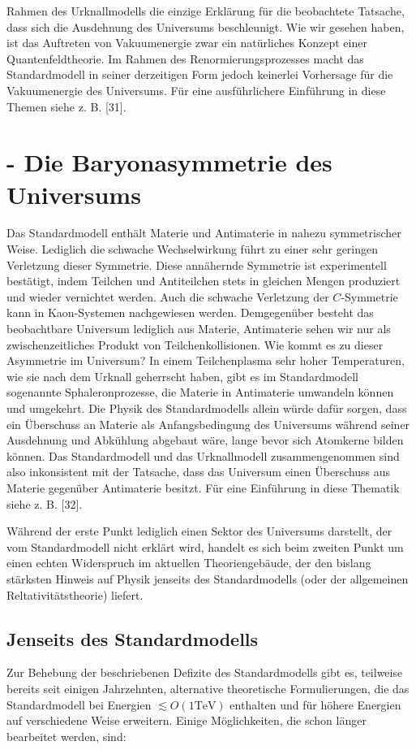\documentclass[10pt, letterpaper]{article}
\begin{document}
Rahmen des Urknallmodells die einzige Erklärung für die beobachtete Tatsache, dass sich die Ausdehnung des Universums beschleunigt. Wie wir gesehen haben, ist das Auftreten von Vakuumenergie zwar ein natürliches Konzept einer Quantenfeldtheorie. Im Rahmen des Renormierungsprozesses macht das Standardmodell in seiner derzeitigen Form jedoch keinerlei Vorhersage für die Vakuumenergie des Universums. Für eine ausführlichere Einführung in diese Themen siehe z. B. [31].

\section*{- Die Baryonasymmetrie des Universums}
Das Standardmodell enthält Materie und Antimaterie in nahezu symmetrischer Weise. Lediglich die schwache Wechselwirkung führt zu einer sehr geringen Verletzung dieser Symmetrie. Diese annähernde Symmetrie ist experimentell bestätigt, indem Teilchen und Antiteilchen stets in gleichen Mengen produziert und wieder vernichtet werden. Auch die schwache Verletzung der $C$-Symmetrie kann in Kaon-Systemen nachgewiesen werden. Demgegenüber besteht das beobachtbare Universum lediglich aus Materie, Antimaterie sehen wir nur als zwischenzeitliches Produkt von Teilchenkollisionen. Wie kommt es zu dieser Asymmetrie im Universum? In einem Teilchenplasma sehr hoher Temperaturen, wie sie nach dem Urknall geherrscht haben, gibt es im Standardmodell sogenannte Sphaleronprozesse, die Materie in Antimaterie umwandeln können und umgekehrt. Die Physik des Standardmodells allein würde dafür sorgen, dass ein Überschuss an Materie als Anfangsbedingung des Universums während seiner Ausdehnung und Abkühlung abgebaut wäre, lange bevor sich Atomkerne bilden können. Das Standardmodell und das Urknallmodell zusammengenommen sind also inkonsistent mit der Tatsache, dass das Universum einen Überschuss aus Materie gegenüber Antimaterie besitzt. Für eine Einführung in diese Thematik siehe z. B. [32].

Während der erste Punkt lediglich einen Sektor des Universums darstellt, der vom Standardmodell nicht erklärt wird, handelt es sich beim zweiten Punkt um einen echten Widerspruch im aktuellen Theoriengebäude, der den bislang stärksten Hinweis auf Physik jenseits des Standardmodells (oder der allgemeinen Reltativitätstheorie) liefert.

\subsection*{Jenseits des Standardmodells}
Zur Behebung der beschriebenen Defizite des Standardmodells gibt es, teilweise bereits seit einigen Jahrzehnten, alternative theoretische Formulierungen, die das Standardmodell bei Energien $\lesssim O(1 \mathrm{TeV})$ enthalten und für höhere Energien auf verschiedene Weise erweitern. Einige Möglichkeiten, die schon länger bearbeitet werden, sind:
\end{document}
